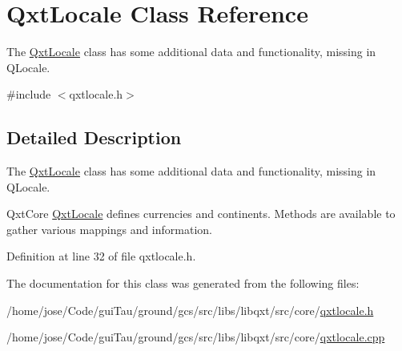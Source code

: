\hypertarget{class_qxt_locale}{\section{Qxt\-Locale Class Reference}
\label{class_qxt_locale}
}


The \hyperlink{class_qxt_locale}{Qxt\-Locale} class has some additional data and functionality, missing in Q\-Locale.  




{\ttfamily \#include $<$qxtlocale.\-h$>$}



\subsection{Detailed Description}
The \hyperlink{class_qxt_locale}{Qxt\-Locale} class has some additional data and functionality, missing in Q\-Locale. 

Qxt\-Core \hyperlink{class_qxt_locale}{Qxt\-Locale} defines currencies and continents. Methods are available to gather various mappings and information. 

Definition at line 32 of file qxtlocale.\-h.



The documentation for this class was generated from the following files\-:\begin{DoxyCompactItemize}
\item 
/home/jose/\-Code/gui\-Tau/ground/gcs/src/libs/libqxt/src/core/\hyperlink{qxtlocale_8h}{qxtlocale.\-h}\item 
/home/jose/\-Code/gui\-Tau/ground/gcs/src/libs/libqxt/src/core/\hyperlink{qxtlocale_8cpp}{qxtlocale.\-cpp}\end{DoxyCompactItemize}
